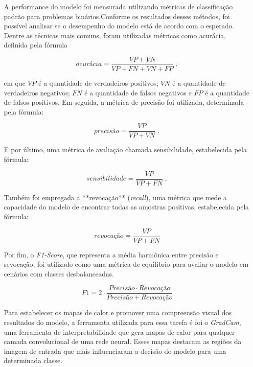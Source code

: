 A performance do modelo foi mensurada utilizando métricas de classificação padrão para problemas binários.Conforme os resultados desses métodos, foi possível analisar se o desempenho do modelo está de acordo com o esperado. Dentre as técnicas mais comuns, foram utilizadas métricas como acurácia, definida pela fórmula 

\begin{equation}
  acurácia = \frac{VP +VN}{VP + FN + VN + FP} \; ,
    \label{eq: acuracia}
\end{equation}

em que \(VP\) é a quantidade de verdadeiros positivos; \(VN\) é a quantidade de verdadeiros negativos; \(FN\) é a quantidade de falsos negativos e \(FP\) é a quantidade de falsos positivos. Em seguida, a métrica de precisão foi utilizada, determinada pela fórmula:

\begin{equation} 
  precisão = \frac{VP}{VP + VN} \; ,
  \label{eq: precisao}
\end{equation}

E por último, uma métrica de avaliação chamada sensibilidade, estabelecida pela fórmula:

\begin{equation}
sensibilidade = \frac{VP}{VP + FN} \; ,
  \label{eq: sensibilidade}
\end{equation}

Também foi empregada a **revocação** (\textit{recall}), uma métrica que mede a capacidade do modelo de encontrar todas as amostras positivas, estabelecida pela fórmula:

\begin{equation}
revocação = \frac{VP}{VP + FN}
  \label{eq:revocacao}
\end{equation}

Por fim, o \textit{F1-Score}, que representa a média harmônica entre precisão e revocação, foi utilizado como uma métrica de equilíbrio para avaliar o modelo em cenários com classes desbalanceadas.

\begin{equation}
  F1 = 2 \cdot \frac{Precisão \cdot Revocação}{Precisão + Revocação}
  \label{eq:f1_score}
\end{equation}

Para estabelecer os mapas de calor e promover uma compreensão visual dos resultados do modelo, a ferramenta utilizada para essa tarefa é foi o \textit{GradCam}, uma ferramenta de interpretabilidade que gera mapas de calor para qualquer camada convolucional de uma rede neural. Esses mapas destacam as regiões da imagem de entrada que mais influenciaram a decisão do modelo para uma determinada classe.

